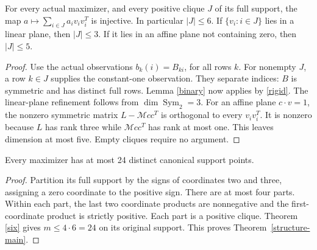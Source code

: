 \begin{theorem}\label{six}
For every actual maximizer, and every positive
clique $J$ of its full support, the map
$a\mapsto\sum_{i\in J}a_iv_iv_i^T$ is injective. In particular $|J|\le6$.
If $\{v_i:i\in J\}$ lies in a linear plane, then $|J|\le3$.
If it lies in an affine plane not containing zero, then $|J|\le5$.
\end{theorem}
\begin{proof}
Use the actual observations $b_k(i)=B_{ki}$, for all rows $k$.
For nonempty $J$, a row $k\in J$ supplies the constant-one observation.
They separate indices: $B$ is symmetric and has distinct full rows.
Lemma \ref{binary} now applies by \eqref{rigid}.
The linear-plane refinement follows from $\dim\operatorname{Sym}_2=3$.
For an affine plane $c\cdot v=1$, the nonzero symmetric matrix
$L-\mathcal M cc^T$ is orthogonal to every $v_iv_i^T$. It is nonzero because $L$
has rank three while $\mathcal M cc^T$ has rank at most one. This leaves dimension at most five.
Empty cliques require no argument.
\end{proof}

\begin{corollary}\label{twentyfour}
Every maximizer has at most 24 distinct canonical support points.
\end{corollary}
\begin{proof}
Partition its full support by the signs of coordinates two and three,
assigning a zero coordinate to the positive sign. There are at most four parts.
Within each part, the last two coordinate products are nonnegative and the
first-coordinate product is strictly positive. Each part is a positive clique.
Theorem \ref{six} gives $m\le4\cdot6=24$ on its original support. This proves Theorem~\ref{structure-main}.
\end{proof}
